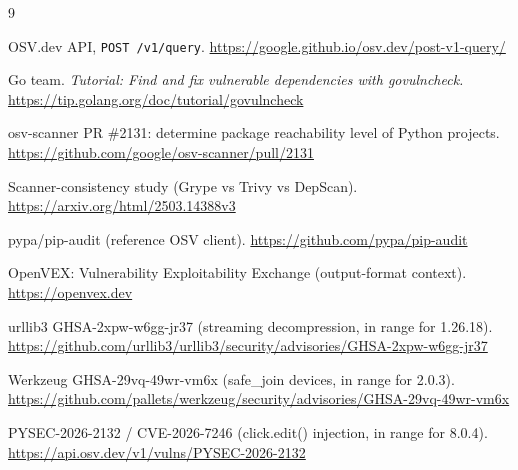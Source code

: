 \documentclass[11pt,a4paper]{article}
\begin{document}
\begin{thebibliography}{9}

 OSV.dev API, \verb!POST /v1/query!. \url{https://google.github.io/osv.dev/post-v1-query/}

 Go team. \textit{Tutorial: Find and fix vulnerable dependencies with govulncheck.} \url{https://tip.golang.org/doc/tutorial/govulncheck}

 osv-scanner PR \#2131: determine package reachability level of Python projects. \url{https://github.com/google/osv-scanner/pull/2131}

 Scanner-consistency study (Grype vs Trivy vs DepScan). \url{https://arxiv.org/html/2503.14388v3}

 pypa/pip-audit (reference OSV client). \url{https://github.com/pypa/pip-audit}

 OpenVEX: Vulnerability Exploitability Exchange (output-format context). \url{https://openvex.dev}

 urllib3 GHSA-2xpw-w6gg-jr37 (streaming decompression, in range for 1.26.18). \url{https://github.com/urllib3/urllib3/security/advisories/GHSA-2xpw-w6gg-jr37}

 Werkzeug GHSA-29vq-49wr-vm6x (safe\_join devices, in range for 2.0.3). \url{https://github.com/pallets/werkzeug/security/advisories/GHSA-29vq-49wr-vm6x}

 PYSEC-2026-2132 / CVE-2026-7246 (click.edit() injection, in range for 8.0.4). \url{https://api.osv.dev/v1/vulns/PYSEC-2026-2132}

\end{thebibliography}
\end{document}
